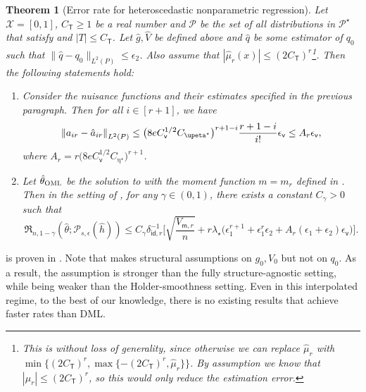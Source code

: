 \documentclass{article}
\def\eps{{\epsilon}}
\def\gP{{\mathcal{P}}}
\def\gX{{\mathcal{X}}}
\newtheorem{theorem}{Theorem}[section]
\newcommand{\oml}{\textsc{OML}}
\begin{document}
\begin{theorem}[Error rate for heteroscedastic nonparametric regression]
\label{thm:heteroscedastic-rate}
    Let $\gX=[0,1]$, $C_{\mathsf{T}} \geq 1$ be a real number and $\gP$ be the set of all distributions in $\gP^{\star}$ that satisfy  and $|T|\leq C_{\mathsf{T}}$. Let $\hat{g}, \hat{V}$ be defined above and $\hat{q}$ be some estimator of $q_0$ such that $\|\hat{q}-q_0\|_{L^2(P)}\leq\eps_2$. Also assume that $|\hat{\mu}_r(x)|\leq (2C_{\mathsf{T}})^r$\footnote{This is without loss of generality, since otherwise we can replace $\hat{\mu}_r$ with $\min\{(2C_{\mathsf{T}})^r,\max\{-(2C_{\mathsf{T}})^r,\hat{\mu}_r\}\}$. By assumption we know that $|\mu_r|\leq (2C_{\mathsf{T}})^r$, so this would only reduce the estimation error.}. Then the following statements hold:
    \begin{enumerate}[(1).]
        \item Consider the nuisance functions and their estimates specified in the previous paragraph. Then for all $i\in[r+1]$, we have
        \begin{equation}
            \notag
            \left\|a_{i r}-\hat{a}_{i r}\right\|_{L^2(P)} \leq\big(8eC_{\mathsf{v}}^{1/2}C_{\upeta^{\star}}\big)^{r+1-i}  \frac{r+1-i}{i!} \eps_{\mathsf{v}} \leq A_r\eps_{\mathsf{v}},
        \end{equation}
        where $A_r = r\big(8eC_{\mathsf{v}}^{1/2}C_{\upeta^{\star}}\big)^{r+1}$.
        \item Let $\hat{\theta}_{\oml}$ be the solution to  with the moment function $m=m_r$ defined in . Then in the setting of , for any $\gamma\in(0,1)$, there exists a constant $C_{\gamma}>0$ such that
        \begin{equation}
            \label{eq:heteroscedastic-rate}
            \mathfrak{R}_{n,1-\gamma} (\hat{\theta};\gP_{s,\eps}(\hat{h})) \leq C_{\gamma}\delta_{\mathsf{id},r}^{-1}
            \bigg[\sqrt{\frac{V_{\mathsf{m},r}}{n}}  + r\lambda_{\star}\big(\eps_1^{r+1}+\eps_1^{r}\eps_2 + A_r(\eps_1+\eps_2)\eps_{\mathsf{v}} \big)\bigg].
        \end{equation}
    \end{enumerate}
\end{theorem}

 is proven in . Note that  makes structural assumptions on $g_0, V_0$ but not on $q_0$. As a result, the assumption is stronger than the fully structure-agnostic setting, while being weaker than the Holder-smoothness setting. Even in this interpolated regime, to the best of our knowledge, there is no existing results that achieve faster rates than DML.
\end{document}
